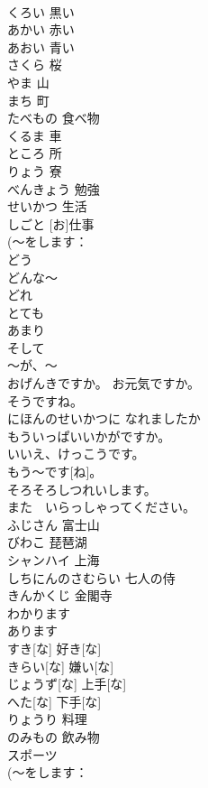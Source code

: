 \documentclass[8pt]{extreport}
\begin{document}
\begin{CJK}{UTF8}{min}
\\	くろい	黒い	
\\	あかい	赤い	
\\	あおい	青い	
\\	さくら	桜	
\\	やま	山	
\\	まち	町	
\\	たべもの	食べ物	
\\	くるま	車	
\\	ところ	所	
\\	りょう	寮	
\\	べんきょう	勉強	
\\	せいかつ	生活	
\\	[お]しごと	[お]仕事	
\\	(～をします：
\\	どう			
\\	どんな～			
\\	どれ			
\\	とても			
\\	あまり			
\\	そして			
\\	～が、～			
\\	おげんきですか。	お元気ですか。	
\\	そうですね。			
\\	にほんのせいかつに なれましたか			
\\	[～、]もういっぱいいかがですか。			
\\	いいえ、けっこうです。			
\\	もう～です[ね]。			
\\	そろそろしつれいします。			
\\	また　いらっしゃってください。			
\\	ふじさん	富士山	
\\	びわこ	琵琶湖	
\\	シャンハイ	上海	
\\	しちにんのさむらい	七人の侍	
\\	きんかくじ	金閣寺	
\\	わかります			
\\	あります			
\\	すき[な]	好き[な]	
\\	きらい[な]	嫌い[な]	
\\	じょうず[な]	上手[な]	
\\	へた[な]	下手[な]	
\\	りょうり	料理	
\\	のみもの	飲み物	
\\	スポーツ			
\\	(～をします：

\end{CJK}
\end{document}
